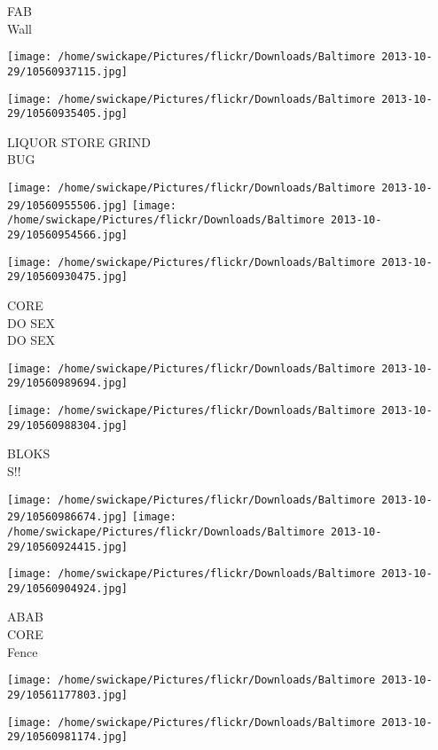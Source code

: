 \documentclass[10pt,letterpaper]{article}
\begin{document}
FAB\\
Wall
\pagebreak

\texttt{[image: /home/swickape/Pictures/flickr/Downloads/Baltimore 2013-10-29/10560937115.jpg]}

\vspace{0.25in}
\texttt{[image: /home/swickape/Pictures/flickr/Downloads/Baltimore 2013-10-29/10560935405.jpg]}

LIQUOR STORE GRIND\\
BUG
\pagebreak

\texttt{[image: /home/swickape/Pictures/flickr/Downloads/Baltimore 2013-10-29/10560955506.jpg]}
\texttt{[image: /home/swickape/Pictures/flickr/Downloads/Baltimore 2013-10-29/10560954566.jpg]}

\texttt{[image: /home/swickape/Pictures/flickr/Downloads/Baltimore 2013-10-29/10560930475.jpg]}

CORE\\
DO SEX\\
DO SEX
\pagebreak

\texttt{[image: /home/swickape/Pictures/flickr/Downloads/Baltimore 2013-10-29/10560989694.jpg]}

\vspace{0.25in}
\texttt{[image: /home/swickape/Pictures/flickr/Downloads/Baltimore 2013-10-29/10560988304.jpg]}

BLOKS\\
S!!
\pagebreak

\texttt{[image: /home/swickape/Pictures/flickr/Downloads/Baltimore 2013-10-29/10560986674.jpg]}
\texttt{[image: /home/swickape/Pictures/flickr/Downloads/Baltimore 2013-10-29/10560924415.jpg]}

\vspace{0.25in}
\texttt{[image: /home/swickape/Pictures/flickr/Downloads/Baltimore 2013-10-29/10560904924.jpg]}

ABAB\\
CORE\\
Fence
\pagebreak

\texttt{[image: /home/swickape/Pictures/flickr/Downloads/Baltimore 2013-10-29/10561177803.jpg]}

\vspace{0.25in}
\texttt{[image: /home/swickape/Pictures/flickr/Downloads/Baltimore 2013-10-29/10560981174.jpg]}
\end{document}
